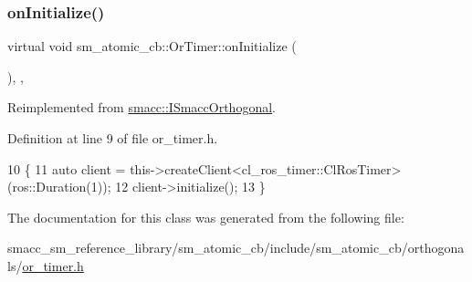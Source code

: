 \subsubsection{\texorpdfstring{on\+Initialize()}{onInitialize()}}
{\footnotesize\ttfamily virtual void sm\+\_\+atomic\+\_\+cb\+::\+Or\+Timer\+::on\+Initialize (\begin{DoxyParamCaption}{ }\end{DoxyParamCaption})\hspace{0.3cm}{\ttfamily [inline]}, {\ttfamily [override]}, {\ttfamily [virtual]}}



Reimplemented from \hyperlink{classsmacc_1_1ISmaccOrthogonal_a6bb31c620cb64dd7b8417f8705c79c7a}{smacc\+::\+I\+Smacc\+Orthogonal}.



Definition at line 9 of file or\+\_\+timer.\+h.


\begin{DoxyCode}
10     \{
11         \textcolor{keyword}{auto} client = this->createClient<cl\_ros\_timer::ClRosTimer>(ros::Duration(1));
12         client->initialize();
13     \}
\end{DoxyCode}


The documentation for this class was generated from the following file\+:\begin{DoxyCompactItemize}
\item 
smacc\+\_\+sm\+\_\+reference\+\_\+library/sm\+\_\+atomic\+\_\+cb/include/sm\+\_\+atomic\+\_\+cb/orthogonals/\hyperlink{sm__atomic__cb_2include_2sm__atomic__cb_2orthogonals_2or__timer_8h}{or\+\_\+timer.\+h}\end{DoxyCompactItemize}
